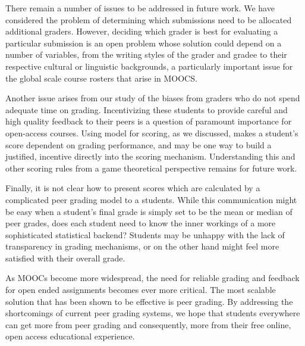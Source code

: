 There remain a number of issues to be addressed in future
work. We have considered the problem of determining which
submissions need to be allocated additional graders. However, deciding which grader is best for evaluating a particular
submission is an open problem whose solution could depend on
a number of variables, from the writing styles of the grader
and gradee to their respective cultural or linguistic backgrounds, a particularly important issue for the global scale
course rosters that arise in MOOCS.

Another issue arises from our study of the biases from graders
who do not spend adequate time on grading. Incentivizing these students to provide careful and high quality
feedback to their peers is a question of paramount importance for open-access courses. Using model \PGthree for scoring, as we discussed, makes
a student's score dependent on grading performance, and
may be one way to build a justified, incentive directly into the scoring mechanism. Understanding this and other scoring rules
from a game theoretical perspective remains for future work. 

Finally, it is not clear how to present scores which are calculated by a complicated peer grading model to a students. While this communication
might be easy when a student's final grade is simply set
to be the mean or median of peer grades, does each student need to know the inner workings of
a more sophisticated statistical backend? Students may be unhappy with the lack of transparency in
grading mechanisms, or on the other hand might feel more satisfied with their overall grade.

As MOOCs become more widespread, the need for reliable
grading and feedback for open ended assignments becomes
ever more critical. The most scalable solution that has been
shown to be effective is peer grading. By addressing the
shortcomings of current peer grading systems, we hope that
students everywhere can get more from peer grading and
consequently, more from their free online, open access educational experience.

